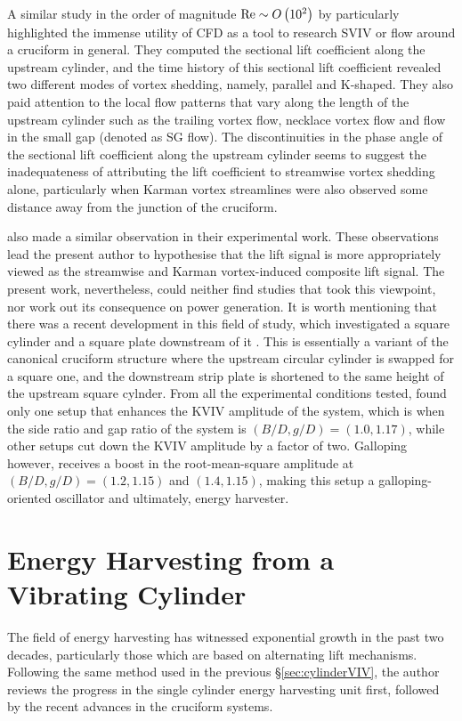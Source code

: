 \documentclass[oneside]{utmthesis}
\begin{document}
A similar study in the order of magnitude $\text{Re} \sim O \left( 10^{2} \right)$ by \citet{Zhao2018a} particularly highlighted the immense utility of CFD as a tool to research SVIV or flow around a cruciform in general. They computed the sectional lift coefficient along the upstream cylinder, and the time history of this sectional lift coefficient revealed two different modes of vortex shedding, namely, parallel and K-shaped. They also paid attention to the local flow patterns that vary along the length of the upstream cylinder such as the trailing vortex flow, necklace vortex flow and flow in the small gap (denoted as SG flow). The discontinuities in the phase angle of the sectional lift coefficient along the upstream cylinder seems to suggest the inadequateness of attributing the lift coefficient to streamwise vortex shedding alone, particularly when Karman vortex streamlines were also observed some distance away from the junction of the cruciform.

\citet{Shirakashi1989} also made a similar observation in their experimental work. These observations lead the present author to hypothesise that the lift signal is more appropriately viewed as the streamwise and Karman vortex-induced composite lift signal. The present work, nevertheless, could neither find studies that took this viewpoint, nor work out its consequence on power generation. It is worth mentioning that there was a recent development in this field of study, which investigated a square cylinder and a square plate downstream of it \citep{Mohamed2021}. This is essentially a variant of the canonical cruciform structure where the upstream circular cylinder is swapped for a square one, and the downstream strip plate is shortened to the same height of the upstream square cylnder. From all the experimental conditions tested, \citet{Mohamed2021} found only one setup that enhances the KVIV amplitude of the system, which is when the side ratio and gap ratio of the system is $(B/D, g/D) = (1.0, 1.17)$, while other setups cut down the KVIV amplitude by a factor of two. Galloping however, receives a boost in the root-mean-square amplitude at $(B/D, g/D) = (1.2, 1.15)$ and $(1.4, 1.15)$, making this setup a galloping-oriented oscillator and ultimately, energy harvester.

\section{Energy Harvesting from a Vibrating Cylinder} \label{sec:energyHarvesting}
The field of energy harvesting has witnessed exponential growth in the past two decades, particularly those which are based on alternating lift mechanisms. Following the same method used in the previous \S\ref{sec:cylinderVIV}, the author reviews the progress in the single cylinder energy harvesting unit first, followed by the recent advances in the cruciform systems.
\end{document}
